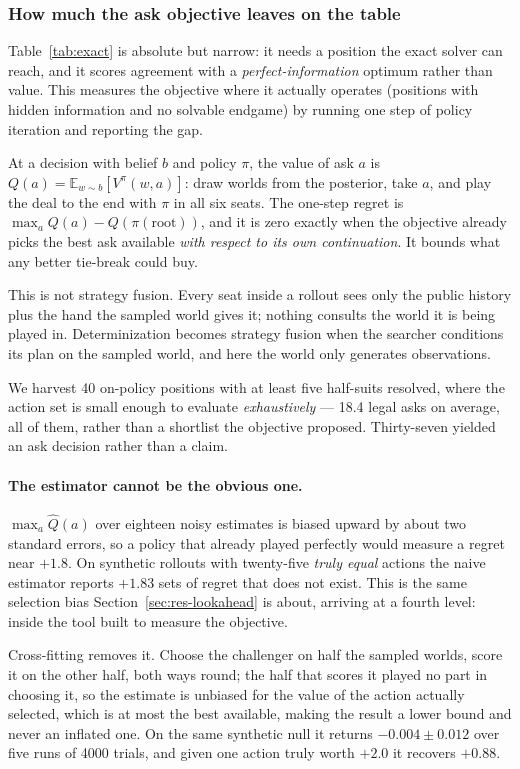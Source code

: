 \documentclass[11pt,letterpaper]{article}
\begin{document}
\subsubsection{How much the ask objective leaves on the table}
\label{sec:res-regret}

Table~\ref{tab:exact} is absolute but narrow: it needs a position the exact
solver can reach, and it scores agreement with a \emph{perfect-information}
optimum rather than value. This measures the objective where it actually
operates (positions with hidden information and no solvable endgame) by
running one step of policy iteration and reporting the gap.

At a decision with belief $b$ and policy $\pi$, the value of ask $a$ is
$Q(a) = \mathbb{E}_{w \sim b}[V^{\pi}(w, a)]$: draw worlds from the posterior,
take $a$, and play the deal to the end with $\pi$ in all six seats. The one-step
regret is $\max_a Q(a) - Q(\pi(\text{root}))$, and it is zero exactly when the
objective already picks the best ask available \emph{with respect to its own
continuation}. It bounds what any better tie-break could buy.

This is not strategy fusion. Every seat inside a rollout sees only the public
history plus the hand the sampled world gives it; nothing consults the world it
is being played in. Determinization becomes strategy fusion when the searcher
conditions its plan on the sampled world, and here the world only generates
observations.

We harvest 40 on-policy positions with at least five half-suits resolved, where
the action set is small enough to evaluate \emph{exhaustively} --- 18.4 legal
asks on average, all of them, rather than a shortlist the objective proposed.
Thirty-seven yielded an ask decision rather than a claim.

\paragraph{The estimator cannot be the obvious one.} $\max_a \widehat{Q}(a)$ over
eighteen noisy estimates is biased upward by about two standard errors, so a
policy that already played perfectly would measure a regret near $+1.8$. On
synthetic rollouts with twenty-five \emph{truly equal} actions the naive
estimator reports $+1.83$ sets of regret that does not exist. This is the same
selection bias Section~\ref{sec:res-lookahead} is about, arriving at a fourth
level: inside the tool built to measure the objective.

Cross-fitting removes it. Choose the challenger on half the sampled worlds,
score it on the other half, both ways round; the half that scores it played no
part in choosing it, so the estimate is unbiased for the value of the action
actually selected, which is at most the best available, making the result a
lower bound and never an inflated one. On the same synthetic null it returns
$-0.004 \pm 0.012$ over five runs of 4000 trials, and given one action truly
worth $+2.0$ it recovers $+0.88$.
\end{document}
